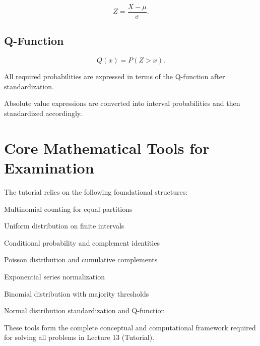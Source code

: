 \documentclass[12pt]{article}
\begin{document}
\[
Z = \frac{X - \mu}{\sigma}.
\]

\subsection*{Q-Function}

\[
Q(x) = P(Z > x).
\]

All required probabilities are expressed in terms of the Q-function after standardization.

Absolute value expressions are converted into interval probabilities and then standardized accordingly.

\section*{Core Mathematical Tools for Examination}

The tutorial relies on the following foundational structures:

Multinomial counting for equal partitions

Uniform distribution on finite intervals

Conditional probability and complement identities

Poisson distribution and cumulative complements

Exponential series normalization

Binomial distribution with majority thresholds

Normal distribution standardization and Q-function

These tools form the complete conceptual and computational framework required for solving all problems in Lecture 13 (Tutorial).
\end{document}

